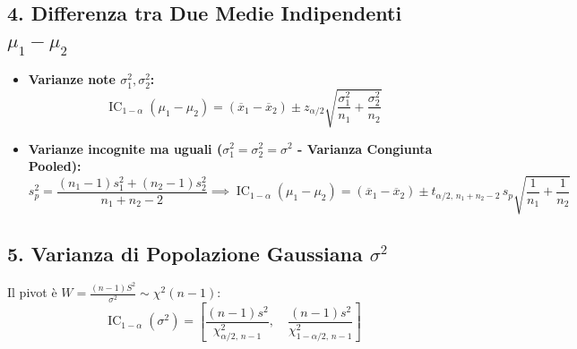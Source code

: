 \subsection{4. Differenza tra Due Medie Indipendenti $\mu_1 - \mu_2$}
\begin{itemize}
    \item \textbf{Varianze note $\sigma_1^2, \sigma_2^2$:}
    \begin{equation}
        \operatorname{IC}_{1-\alpha}(\mu_1 - \mu_2) = (\overline{x}_1 - \overline{x}_2) \pm z_{\alpha/2}\sqrt{\frac{\sigma_1^2}{n_1} + \frac{\sigma_2^2}{n_2}}
    \end{equation}
    \item \textbf{Varianze incognite ma uguali ($\sigma_1^2 = \sigma_2^2 = \sigma^2$ - Varianza Congiunta Pooled):}
    \begin{equation}
        s_p^2 = \frac{(n_1 - 1)s_1^2 + (n_2 - 1)s_2^2}{n_1 + n_2 - 2} \implies \operatorname{IC}_{1-\alpha}(\mu_1 - \mu_2) = (\overline{x}_1 - \overline{x}_2) \pm t_{\alpha/2, \, n_1+n_2-2} \, s_p \sqrt{\frac{1}{n_1} + \frac{1}{n_2}}
    \end{equation}
\end{itemize}

\subsection{5. Varianza di Popolazione Gaussiana $\sigma^2$}
Il pivot è $W = \frac{(n-1)S^2}{\sigma^2} \sim \chi^2(n-1)$:
\begin{equation}
    \operatorname{IC}_{1-\alpha}(\sigma^2) = \left[ \frac{(n-1)s^2}{\chi^2_{\alpha/2, \, n-1}}, \quad \frac{(n-1)s^2}{\chi^2_{1-\alpha/2, \, n-1}} \right]
\end{equation}
